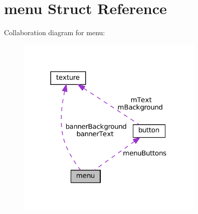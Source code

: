 \hypertarget{structmenu}{}\section{menu Struct Reference}
\label{structmenu}


Collaboration diagram for menu\+:
\nopagebreak
\begin{figure}[H]
\begin{center}
\leavevmode
\includegraphics[width=254pt]{structmenu__coll__graph}
\end{center}
\end{figure}
